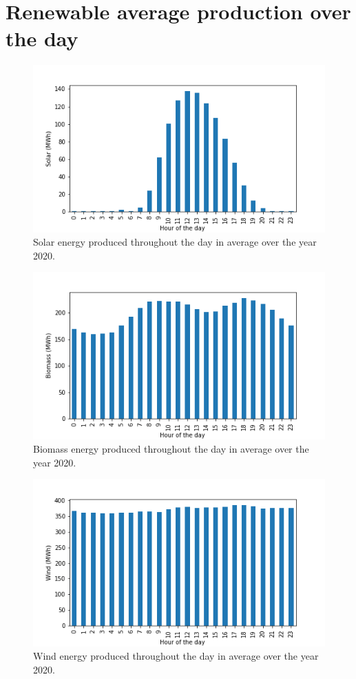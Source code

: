\documentclass[11pt]{article} %
\begin{document}
\section{Renewable average production over the day}\label{app:renewable}
\begin{figure}[h!]
  \includegraphics[width=0.8\linewidth]{../outputs/Solar.png}
  \caption{Solar energy produced throughout the day in average over the year 2020.}
  \label{fig:solar_kwh}
\end{figure}
\begin{figure}[h!]
  \includegraphics[width=0.8\linewidth]{../outputs/Biomass.png}
  \caption{Biomass energy produced throughout the day in average over the year 2020.}
  \label{fig:biomass_kwh}
\end{figure}
\begin{figure}[h!]
  \includegraphics[width=0.8\linewidth]{../outputs/Wind.png}
  \caption{Wind energy produced throughout the day in average over the year 2020.}
  \label{fig:wind_kwh}
\end{figure}
\end{document}
